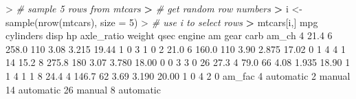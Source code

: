 \documentclass[
]{book}
\newenvironment{Shaded}{\begin{snugshade}}{\end{snugshade}}
\newcommand{\AttributeTok}[1]{\textcolor[rgb]{0.77,0.63,0.00}{#1}}
\newcommand{\CommentTok}[1]{\textcolor[rgb]{0.56,0.35,0.01}{\textit{#1}}}
\newcommand{\DecValTok}[1]{\textcolor[rgb]{0.00,0.00,0.81}{#1}}
\newcommand{\ErrorTok}[1]{\textcolor[rgb]{0.64,0.00,0.00}{\textbf{#1}}}
\newcommand{\FloatTok}[1]{\textcolor[rgb]{0.00,0.00,0.81}{#1}}
\newcommand{\FunctionTok}[1]{\textcolor[rgb]{0.00,0.00,0.00}{#1}}
\newcommand{\NormalTok}[1]{#1}
\newcommand{\OtherTok}[1]{\textcolor[rgb]{0.56,0.35,0.01}{#1}}
\newcommand{\SpecialCharTok}[1]{\textcolor[rgb]{0.00,0.00,0.00}{#1}}
\begin{document}
\begin{Shaded}
\begin{Highlighting}[]
\SpecialCharTok{\textgreater{}} \CommentTok{\# sample 5 rows from mtcars}
\ErrorTok{\textgreater{}} \CommentTok{\# get random row numbers}
\ErrorTok{\textgreater{}}\NormalTok{ i }\OtherTok{\textless{}{-}} \FunctionTok{sample}\NormalTok{(}\FunctionTok{nrow}\NormalTok{(mtcars), }\AttributeTok{size =} \DecValTok{5}\NormalTok{)}
\SpecialCharTok{\textgreater{}} \CommentTok{\# use i to select rows}
\ErrorTok{\textgreater{}}\NormalTok{ mtcars[i,]}
\NormalTok{    mpg cylinders  disp  hp axle\_ratio weight  qsec engine am gear carb am\_ch}
\DecValTok{4}  \FloatTok{21.4}         \DecValTok{6} \FloatTok{258.0} \DecValTok{110}       \FloatTok{3.08}  \FloatTok{3.215} \FloatTok{19.44}      \DecValTok{1}  \DecValTok{0}    \DecValTok{3}    \DecValTok{1}     \DecValTok{0}
\DecValTok{2}  \FloatTok{21.0}         \DecValTok{6} \FloatTok{160.0} \DecValTok{110}       \FloatTok{3.90}  \FloatTok{2.875} \FloatTok{17.02}      \DecValTok{0}  \DecValTok{1}    \DecValTok{4}    \DecValTok{4}     \DecValTok{1}
\DecValTok{14} \FloatTok{15.2}         \DecValTok{8} \FloatTok{275.8} \DecValTok{180}       \FloatTok{3.07}  \FloatTok{3.780} \FloatTok{18.00}      \DecValTok{0}  \DecValTok{0}    \DecValTok{3}    \DecValTok{3}     \DecValTok{0}
\DecValTok{26} \FloatTok{27.3}         \DecValTok{4}  \FloatTok{79.0}  \DecValTok{66}       \FloatTok{4.08}  \FloatTok{1.935} \FloatTok{18.90}      \DecValTok{1}  \DecValTok{1}    \DecValTok{4}    \DecValTok{1}     \DecValTok{1}
\DecValTok{8}  \FloatTok{24.4}         \DecValTok{4} \FloatTok{146.7}  \DecValTok{62}       \FloatTok{3.69}  \FloatTok{3.190} \FloatTok{20.00}      \DecValTok{1}  \DecValTok{0}    \DecValTok{4}    \DecValTok{2}     \DecValTok{0}
\NormalTok{      am\_fac}
\DecValTok{4}\NormalTok{  automatic}
\DecValTok{2}\NormalTok{     manual}
\DecValTok{14}\NormalTok{ automatic}
\DecValTok{26}\NormalTok{    manual}
\DecValTok{8}\NormalTok{  automatic}
\end{Highlighting}
\end{Shaded}
\end{document}
